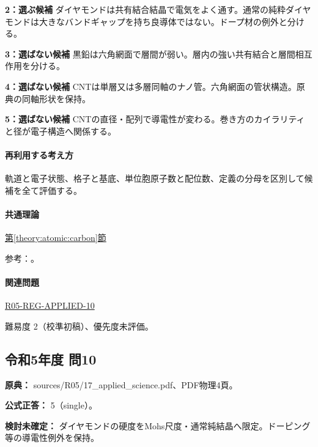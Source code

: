\noindent\textbf{2：選ぶ候補} ダイヤモンドは共有結合結晶で電気をよく通す。通常の純粋ダイヤモンドは大きなバンドギャップを持ち良導体ではない。ドープ材の例外と分ける。\par

\noindent\textbf{3：選ばない候補} 黒鉛は六角網面で層間が弱い。層内の強い共有結合と層間相互作用を分ける。\par

\noindent\textbf{4：選ばない候補} CNTは単層又は多層同軸のナノ管。六角網面の管状構造。原典の同軸形状を保持。\par

\noindent\textbf{5：選ばない候補} CNTの直径・配列で導電性が変わる。巻き方のカイラリティと径が電子構造へ関係する。\par

\paragraph{再利用する考え方} 軌道と電子状態、格子と基底、単位胞原子数と配位数、定義の分母を区別して候補を全て評価する。

\paragraph{共通理論} \hyperref[theory:atomic:carbon]{第\ref*{theory:atomic:carbon}節}

\par 参考：\cite{atomic_cnt,atomic_diamond}。

\paragraph{関連問題} \hyperref[q:r05-reg-applied-10]{R05-REG-APPLIED-10}

\par 難易度 2（校準初稿）、優先度未評価。

\subsection{令和5年度 問10}
\label{q:r05-reg-applied-10}

\noindent\textbf{原典：} sources/R05/17\_applied\_science.pdf、PDF物理4頁。

\textbf{公式正答：} 5（single）。

\par\textbf{検討未確定：} ダイヤモンドの硬度をMohs尺度・通常純結晶へ限定。ドーピング等の導電性例外を保持。

